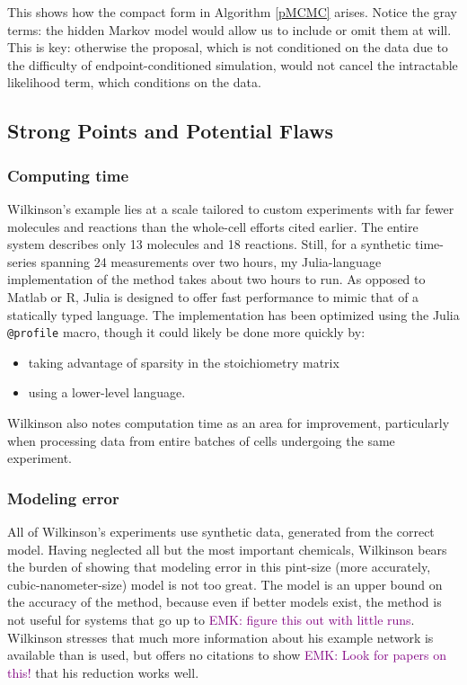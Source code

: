 \documentclass{article}
\newcommand\EMK[1]{\textcolor{purple}{EMK: #1}}
\begin{document}
This shows how the compact form in Algorithm \ref{pMCMC} arises. Notice the gray terms: the hidden Markov model would allow us to include or omit them at will. This is key: otherwise the proposal, which is not conditioned on the data due to the difficulty of endpoint-conditioned simulation, would not cancel the intractable likelihood term, which conditions on the data. %

\subsection{Strong Points and Potential Flaws}
\subsubsection{Computing time}
Wilkinson's example lies at a scale tailored to custom experiments with far fewer molecules and reactions than the whole-cell efforts cited earlier. The entire system describes only 13 molecules and 18 reactions. Still, for a synthetic time-series spanning 24 measurements over two hours, my Julia-language implementation of the method takes about two hours to run. As opposed to Matlab or R, Julia is designed to offer fast performance to mimic that of a statically typed language. The implementation has been optimized using the Julia \texttt{@profile} macro, though it could likely be done more quickly by:
\begin{itemize}
\item taking advantage of sparsity in the stoichiometry matrix 
\item using a lower-level language.
\end{itemize}

Wilkinson also notes computation time as an area for improvement, particularly when processing data from entire batches of cells undergoing the same experiment.

\subsubsection{Modeling error}
All of Wilkinson's experiments use synthetic data, generated from the correct model. Having neglected all but the most important chemicals, Wilkinson bears the burden of showing that modeling error in this pint-size (more accurately, cubic-nanometer-size) model is not too great. The model is an upper bound on the accuracy of the method, because even if better models exist, the method is not useful for systems that go up to \EMK{figure this out with little runs}. Wilkinson stresses that much more information about his example network is available than is used, but offers no citations to show \EMK{Look for papers on this!} that his reduction works well.
\end{document}
